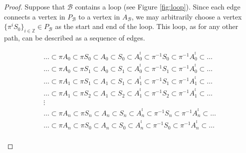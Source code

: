 \documentclass{eptcs}
\theoremstyle{remark}
\theoremstyle{definition}
\newcommand{\dual}[1]{{#1}^{\sharp}}
\begin{document}
\begin{proof}
    Suppose that $\mathcal{B}$ contains a loop (see Figure \ref{fig:loop}). Since each edge connects a vertex in $P_\mathcal{B}$ to a vertex in $A_\mathcal{B}$, we may arbitrarily choose a vertex $\{\pi^iS_0\}_{i \in \mathbb{Z}} \in P_\mathcal{B}$ as the start and end of the loop. This loop, as for any other path, can be described as a sequence of edges.

    \begin{align}
    \dots \subset \pi A_0\subset \pi S_0 \subset A_0 \subset S_0 \subset A_0^{\dual{}} \subset \pi^{-1}S_0 \subset \pi^{-1} A_0^{\dual{}} \subset \dots \\
    \dots \subset \pi A_0\subset \pi S_1\subset A_0 \subset S_1 \subset A_0^{\dual{}} \subset \pi^{-1}S_1 \subset \pi^{-1} A_0^{\dual{}} \subset \dots\\
    \dots \subset \pi A_1\subset \pi S_1 \subset A_1 \subset S_1 \subset A_1^{\dual{}} \subset \pi^{-1}S_1 \subset \pi^{-1} A_1^{\dual{}} \subset \dots\\
    \dots \subset \pi A_1\subset \pi S_2 \subset A_1 \subset S_2 \subset A_1^{\dual{}} \subset \pi^{-1}S_2 \subset \pi^{-1} A_1^{\dual{}} \subset \dots\\
    {\vdots}\\
    \dots \subset \pi A_n\subset \pi S_n \subset A_n \subset S_n \subset A_n^{\dual{}} \subset \pi^{-1}S_n \subset \pi^{-1} A_n^{\dual{}} \subset \dots \\
    \dots \subset \pi A_n\subset \pi S_0 \subset A_n \subset S_0 \subset A_n^{\dual{}} \subset \pi^{-1}S_0 \subset \pi^{-1} A_n^{\dual{}} \subset \dots \\
    \end{align}

\begin{figure}
    \centering
    \begin{center}
\end{center}
\end{figure}
\end{proof}
\end{document}
